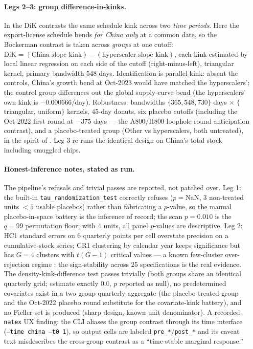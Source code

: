 \documentclass[11pt]{article}
\newcommand{\natex}{\texttt{natex}}
\begin{document}
\paragraph{Legs 2--3: group difference-in-kinks.} In \cite{bockerman2025} the
DiK contrasts the same schedule kink across two \emph{time periods}. Here the
export-license schedule bends \emph{for China only} at a common date, so the
B\"ockerman contrast is taken across \emph{groups} at one cutoff:
$\mathrm{DiK} = (\text{China slope kink}) - (\text{hyperscaler slope kink})$,
each kink estimated by local linear regression on each side of the cutoff
(right-minus-left), triangular kernel, primary bandwidth 548 days.
Identification is parallel-kink: absent the controls, China's growth bend at
Oct-2023 would have matched the hyperscalers'; the control group differences
out the global supply-curve bend (the hyperscalers' own kink is
$-0.000666$/day). Robustness: bandwidths $\{365,548,730\}$ days $\times$
$\{$triangular, uniform$\}$ kernels, 45-day donuts, six placebo cutoffs
(including the Oct-2022 first round at $-375$ days --- the A800/H800
loophole-round anticipation contrast), and a placebo-treated group (Other vs
hyperscalers, both untreated), in the spirit of \cite{ganong2018}. Leg 3
re-runs the identical design on China's total stock including smuggled
chips.

\paragraph{Honest-inference notes, stated as run.} The pipeline's refusals
and trivial passes are reported, not patched over. Leg 1: the built-in
\texttt{tau\_randomization\_test} correctly refuses ($p=\mathrm{NaN}$, 3
non-treated units $<5$ usable placebos) rather than fabricating a $p$-value,
so the manual placebo-in-space battery is the inference of record; the scan
$p=0.010$ is the $q=99$ permutation floor; with 4 units, all panel $p$-values
are descriptive. Leg 2: HC1 standard errors on 6 quarterly points per cell
overstate precision on a cumulative-stock series; CR1 clustering by calendar
year keeps significance but has $G=4$ clusters with $t(G-1)$ critical values
--- a known few-cluster over-rejection regime \cite{cameron2015}; the
sign-stability across 25 specifications is the real evidence. The
density-kink-difference test passes trivially (both groups share an identical
quarterly grid; estimate exactly $0.0$, $p$ reported as null), no
predetermined covariates exist in a two-group quarterly aggregate (the
placebo-treated group and the Oct-2022 placebo round substitute for the
covariate-kink battery), and no Fieller set is produced (sharp design, known
unit denominator). A recorded \natex{} UX finding: the CLI aliases the group
contrast through its time interface (\texttt{--time china --t0 1}), so output
cells are labeled \texttt{pre\_*}/\texttt{post\_*} and its caveat text
misdescribes the cross-group contrast as a ``time-stable marginal
response.''
\end{document}
